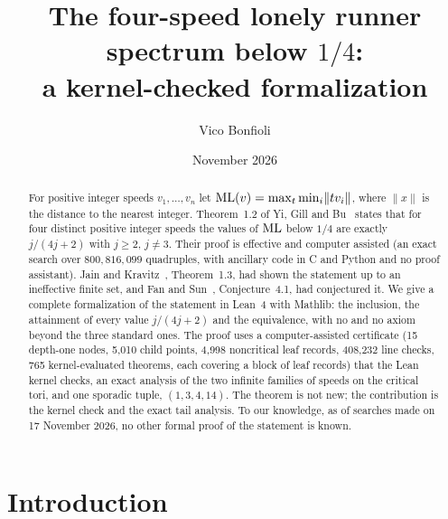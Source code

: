 \documentclass[11pt]{article}
\title{The four-speed lonely runner spectrum below $1/4$:\\ a kernel-checked formalization}
\author{Vico Bonfioli}
\date{November 2026}
\theoremstyle{remark}
\newcommand{\dist}[1]{\lVert #1\rVert}
\newcommand{\lean}[1]{{\small\texttt{\detokenize{#1}}}}
\begin{document}
\maketitle

\begin{abstract}
For positive integer speeds $v_1,\dots,v_n$ let $\ML(v)=\max_{t}\min_i\dist{tv_i}$, where $\dist{x}$ is the distance to the nearest integer. Theorem~1.2 of Yi, Gill and Bu~\cite{YGB} states that for four distinct positive integer speeds the values of $\mathrm{ML}$ below $1/4$ are exactly $j/(4j+2)$ with $j\ge2$, $j\ne3$. Their proof is effective and computer assisted (an exact search over $800{,}816{,}099$ quadruples, with ancillary code in C and Python and no proof assistant). Jain and Kravitz~\cite{JK}, Theorem~1.3, had shown the statement up to an ineffective finite set, and Fan and Sun~\cite{FanSun}, Conjecture~4.1, had conjectured it. We give a complete formalization of the statement in Lean~4 with Mathlib: the inclusion, the attainment of every value $j/(4j+2)$ and the equivalence, with no \lean{sorry} and no axiom beyond the three standard ones. The proof uses a computer-assisted certificate (15 depth-one nodes, 5{,}010 child points, 4{,}998 noncritical leaf records, 408{,}232 line checks, 765 kernel-evaluated theorems, each covering a block of leaf records) that the Lean kernel checks, an exact analysis of the two infinite families of speeds on the critical tori, and one sporadic tuple, $(1,3,4,14)$. The theorem is not new; the contribution is the kernel check and the exact tail analysis. To our knowledge, as of searches made on 17 November 2026, no other formal proof of the statement is known.
\end{abstract}

\section{Introduction}\label{sec:intro}
\end{document}
